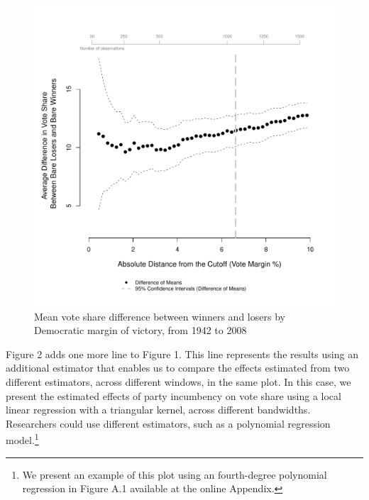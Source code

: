 \documentclass[letterpaper,twoside,12pt]{article}
\begin{document}
\begin{figure}
  \caption{Mean vote share difference between winners and losers by Democratic margin of victory, from 1942 to 2008}\label{fig:main_est}
\vspace{-1mm}
  \centerline{\includegraphics[width=1\textwidth]{no_add_est_plot.pdf}}
  \end{figure}
\clearpage

Figure 2 adds one more line to Figure 1. This line represents the results using an additional estimator that enables us to compare the effects estimated from two different estimators, across different windows, in the same plot. In this case, we present the estimated effects of party incumbency on vote share using a local linear regression with a triangular kernel, across different bandwidths. Researchers could use different estimators, such as a polynomial regression model.\footnote{We present an example of this plot using an fourth-degree polynomial regression in Figure A.1 available at the online Appendix.}
\end{document}
